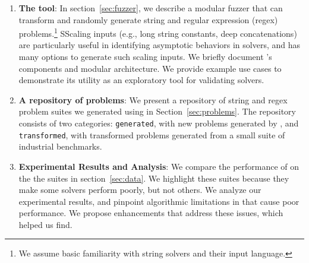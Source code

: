 \begin{enumerate}
\item \textbf{The \fuzzer{} tool}:
    In section~\ref{sec:fuzzer}, we describe a modular fuzzer that can
    transform and randomly generate \smtfull{} string and regular
    expression (regex) problems.\footnote{We assume basic
    familiarity with string solvers and their input
    language.} SScaling inputs (e.g., long string constants,
    deep concatenations) are particularly useful in identifying asymptotic
    behaviors in solvers, and \fuzzer{} has many options to generate such
    scaling inputs. We briefly document \fuzzer{}'s
    components and modular architecture. We provide example use cases to
    demonstrate its utility as an exploratory tool for validating
    solvers.


\item \textbf{A repository of \smtfull{} problems}:
    We present a repository of \smtfull{} string and regex problem suites we
    generated using \fuzzer{} in Section~\ref{sec:problems}. The repository
    consists of two categories: \texttt{generated}, with new problems generated
    by \fuzzer{}, and \texttt{transformed}, with transformed problems generated
    from a small suite of industrial benchmarks.

\item \textbf{Experimental Results and Analysis}:
    We compare the performance of \theSolvers{} on the
    the \fuzzer{} suites \theSuites{} in section~\ref{sec:data}. We highlight
    these suites because they make some solvers perform poorly,
    but not others. We analyze our
    experimental results, and pinpoint algorithmic limitations
    in \us{} that cause poor performance. We propose enhancements that
    address these issues, which \fuzzer{} helped us find.
\end{enumerate}
